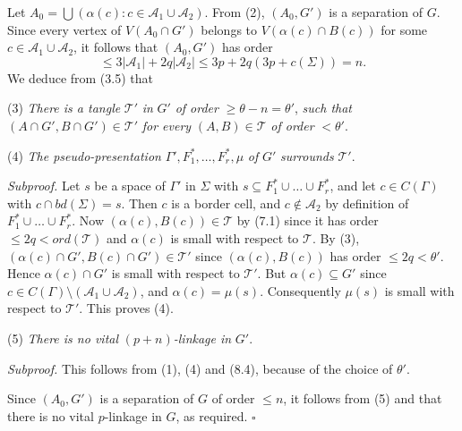 Let $A_0 = \bigcup(\alpha(c) : c \in \mathcal{A}_1 \cup \mathcal{A}_2)$. From (2), $(A_0, G')$ is a separation of $G$. Since every vertex of $V(A_0 \cap G')$ belongs to $V(\alpha(c) \cap B(c))$ for some $c \in \mathcal{A}_1 \cup \mathcal{A}_2$, it follows that $(A_0, G')$ has order
\begin{equation*}
\le 3|\mathcal{A}_1| + 2q|\mathcal{A}_2| \le 3p + 2q(3p + c(\Sigma)) = n.
\end{equation*}
We deduce from (3.5) that

\hspace*{12pt}(3) \textit{There is a tangle} $\mathcal{T}'$ \textit{in} $G'$ \textit{of order} $\ge \theta - n = \theta'$, \textit{such that} $(A \cap G', B \cap G') \in \mathcal{T}'$ \textit{for every} $(A, B) \in \mathcal{T}$ \textit{of order} $< \theta'$.

\hspace*{12pt}(4) \textit{The pseudo-presentation} $\Gamma', F_1^*, \dots, F_r^*, \mu$ \textit{of} $G'$ \textit{surrounds} $\mathcal{T}'$.

\textit{Subproof.} Let $s$ be a space of $\Gamma'$ in $\Sigma$ with $s \subseteq F_1^* \cup \dots \cup F_r^*$, and let $c \in C(\Gamma)$ with $c \cap bd(\Sigma) = s$. Then $c$ is a border cell, and $c \not\in \mathcal{A}_2$ by definition of $F_1^* \cup \dots \cup F_r^*$. Now $(\alpha(c), B(c)) \in \mathcal{T}$ by (7.1) since it has order $\le 2q < ord(\mathcal{T})$ and $\alpha(c)$ is small with respect to $\mathcal{T}$. By (3), $(\alpha(c) \cap G', B(c) \cap G') \in \mathcal{T}'$ since $(\alpha(c), B(c))$ has order $\le 2q < \theta'$. Hence $\alpha(c) \cap G'$ is small with respect to $\mathcal{T}'$. But $\alpha(c) \subseteq G'$ since $c \in C(\Gamma) \setminus (\mathcal{A}_1 \cup \mathcal{A}_2)$, and $\alpha(c) = \mu(s)$. Consequently $\mu(s)$ is small with respect to $\mathcal{T}'$. This proves (4).

\hspace*{12pt}(5) \textit{There is no vital} $(p + n)$\textit{-linkage in} $G'$.

\textit{Subproof.} This follows from (1), (4) and (8.4), because of the choice of $\theta'$.

Since $(A_0, G')$ is a separation of $G$ of order $\le n$, it follows from (5) and  that there is no vital $p$-linkage in $G$, as required. $\square$

